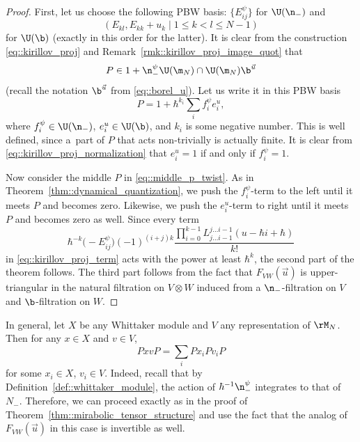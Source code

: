 \begin{Theorem}
\begin{proof}
			First, let us choose the following PBW basis: $\bigl\{E_{ij}^{\psi}\bigr\}$ for $\U(\n_-)$ and
			\[
			(E_{kl}, E_{kk} + u_k \mid 1 \leq k < l \leq N-1)
			\]
			for $\U(\b)$ (exactly in this order for the latter). It is clear from the construction \eqref{eq::kirillov_proj} and Remark~\ref{rmk::kirillov_proj_image_quot} that
			\begin{equation}
				\label{eq::kirillov_proj_normalization}
				P \in 1 + \n_-^{\psi} \U(\m_N) \cap \U(\m_N) \b^{\vec{u}}
			\end{equation}
			(recall the notation $\b^{\vec{u}}$ from \eqref{eq::borel_u}). Let us write it in this PBW basis
			\begin{equation*}
				P = 1 + \hbar^{k_i}\sum\limits_i f^{\psi}_i e_i^u,
			\end{equation*}
			where $f^{\psi}_i \in \U(\n_-)$, $e_i^u \in \U(\b)$, and $k_i$ is some negative number. This is well defined, since a~part of $P$ that acts non-trivially is actually finite. It is clear from \eqref{eq::kirillov_proj_normalization} that $e^u_i=1$ if and only if $f^{\psi}_i=1$.
			
			Now consider the middle $P$ in \eqref{eq::middle_p_twist}. As in Theorem~\ref{thm::dynamical_quantization}, we push the $f_i^{\psi}$-term to the left until it meets $P$ and becomes zero. Likewise, we push the $e_i^u$-term to right until it meets $P$ and becomes zero as well. Since every term
			\[
			\hbar^{-k} \bigl(-E_{ij}^{\psi}\bigr) (-1)^{(i+j)k} \frac{\prod_{i=0}^{k-1} L_{j \dots i-1}^{j \dots i-1}(u-\hbar i + \hbar)}{k!}
			\]
			in \eqref{eq::kirillov_proj_term} acts with the power at least $\hbar^k$, the second part of the theorem follows. The third part follows from the fact that $F_{VW}(\vec{u})$ is upper-triangular in the natural filtration on $V\otimes W$ induced from a $\n_-$-filtration on $V$ and $\b$-filtration on $W$.
		\end{proof}
	\end{Theorem}
	
	\begin{Remark}
		\label{rmk::mirabolic_tensor_structure}
		In general, let $X$ be any Whittaker module and $V$ any representation of $\rM_N$. Then for any $x\in X$ and $v\in V$,
		\[
		PxvP = \sum\limits_i Px_i P v_i P
		\]
		for some $x_i\in X$, $v_i \in V$. Indeed, recall that by Definition~\ref{def::whittaker_module}, the action of $\hbar^{-1} \n_-^{\psi}$ integrates to that of $N_-$. Therefore, we can proceed exactly as in the proof of Theorem~\ref{thm::mirabolic_tensor_structure} and use the fact that the analog of $F_{VW}(\vec{u})$ in this case is invertible as well.
	\end{Remark}
